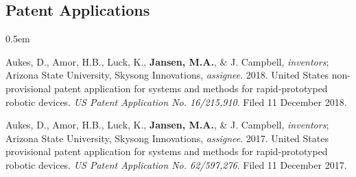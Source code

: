 \documentclass[12pt,a4paper]{article}
\begin{document}
	\subsection*{Patent Applications}
		\begin{description}
			\itemsep0.5em
			\item Aukes, D., Amor, H.B., Luck, K., \textbf{Jansen, M.A.}, \& J. Campbell, \textit{inventors}; Arizona State University, Skysong Innovations, \textit{assignee}. 2018. United States non-provisional patent application for systems and methods for rapid-prototyped robotic devices. \textit{US Patent Application No. 16/215,910}. Filed 11 December 2018.
			
			\item Aukes, D., Amor, H.B., Luck, K., \textbf{Jansen, M.A.}, \& J. Campbell, \textit{inventors}; Arizona State University, Skysong Innovations, \textit{assignee}. 2017. United States provisional patent application for systems and methods for rapid-prototyped robotic devices. \textit{US Patent Application No. 62/597,276}. Filed 11 December 2017.
		\end{description}
\end{document}
